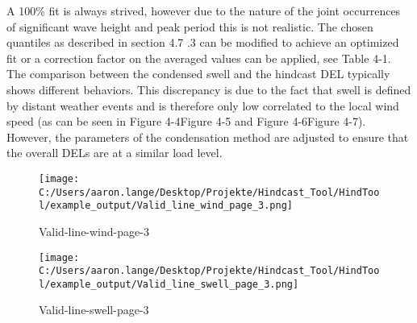 A 100\% fit is always strived, however due to the nature of the joint occurrences of significant wave height and peak period this is not realistic. The chosen quantiles as described in section 4.7 .3 can be modified to achieve an optimized fit or a correction factor on the averaged values can be applied, see Table 4-1. The comparison between the condensed swell and the hindcast DEL typically shows different behaviors. This discrepancy is due to the fact that swell is defined by distant weather events and is therefore only low correlated to the local wind speed (as can be seen in Figure 4-4Figure 4-5 and Figure 4-6Figure 4-7). However, the parameters of the condensation method are adjusted to ensure that the overall DELs are at a similar load level.\\


\begin{figure}[H] 
 \centering 
 \texttt{[image: C:/Users/aaron.lange/Desktop/Projekte/Hindcast\_Tool/HindTool/example\_output/Valid\_line\_wind\_page\_3.png]} 
 \caption{ Valid-line-wind-page-3 } 
 \label{fig: Valid_line_wind_page_3 } 
\end{figure}

\begin{figure}[H] 
 \centering 
 \texttt{[image: C:/Users/aaron.lange/Desktop/Projekte/Hindcast\_Tool/HindTool/example\_output/Valid\_line\_swell\_page\_3.png]} 
 \caption{ Valid-line-swell-page-3 } 
 \label{fig: Valid_line_swell_page_3 } 
\end{figure}

